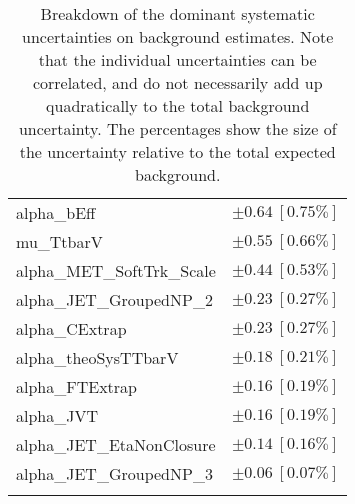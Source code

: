 \begin{table}
\begin{center}
\begin{tabular*}{\textwidth}{@{\extracolsep{\fill}}lc}
alpha\_bEff         & $\pm 0.64\ [0.75\%] $       \\
mu\_TtbarV         & $\pm 0.55\ [0.66\%] $       \\
alpha\_MET\_SoftTrk\_Scale         & $\pm 0.44\ [0.53\%] $       \\
alpha\_JET\_GroupedNP\_2         & $\pm 0.23\ [0.27\%] $       \\
alpha\_CExtrap         & $\pm 0.23\ [0.27\%] $       \\
alpha\_theoSysTTbarV         & $\pm 0.18\ [0.21\%] $       \\
alpha\_FTExtrap         & $\pm 0.16\ [0.19\%] $       \\
alpha\_JVT         & $\pm 0.16\ [0.19\%] $       \\
alpha\_JET\_EtaNonClosure         & $\pm 0.14\ [0.16\%] $       \\
alpha\_JET\_GroupedNP\_3         & $\pm 0.06\ [0.07\%] $       \\
\noalign{\smallskip}\hline\noalign{\smallskip}
\end{tabular*}
\end{center}
\caption[Breakdown of uncertainty on background estimates]{
Breakdown of the dominant systematic uncertainties on background estimates.
Note that the individual uncertainties can be correlated, and do not necessarily add up quadratically to 
the total background uncertainty. The percentages show the size of the uncertainty relative to the total expected background.
\label{table.results.bkgestimate.uncertainties.VRZE}}
\end{table}
%